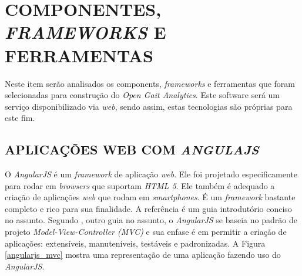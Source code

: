 \section[COMPONENTES, FRAMEWORKS E FERRAMENTAS]{COMPONENTES, \emph{FRAMEWORKS} E FERRAMENTAS}
Neste item serão analisados os components, \emph{frameworks} e ferramentas que foram selecionadas para construção do \emph{Open Gait Analytics}. 
Este software será um serviço disponibilizado via \emph{web}, sendo assim, estas tecnologias são próprias para este fim. 

\subsection{APLICAÇÕES WEB COM \emph{ANGULAJS}}
\label{angularjs}
O \emph{AngularJS} é um \emph{framework} de aplicação \emph{web}. 
Ele foi projetado especificamente para rodar em \emph{browsers} que suportam \emph{HTML 5}.
Ele também é adequado a criação de aplicações \emph{web} que rodam em \emph{smartphones}. 
É um \emph{framework} bastante completo e rico para sua finalidade. 
A referência \cite{Branas2014} é um guia introdutório conciso no assunto.
 Segundo \cite{Freeman2014}, outro guia no assunto, o \emph{AngularJS} se baseia no padrão de projeto \emph{Model-View-Controller (MVC)} e sua enfase é em permitir a criação de aplicações: extensíveis, manuteníveis, testáveis e padronizadas. 
A Figura \ref{angularjs_mvc} mostra uma representação de uma aplicação fazendo uso do \emph{AngularJS}.


